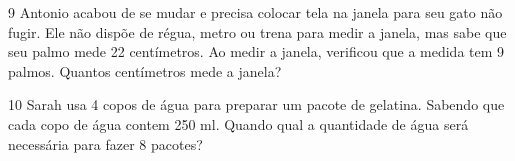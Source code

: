 \num{9} Antonio acabou de se mudar e precisa colocar tela na janela para seu gato não fugir.
Ele não dispõe de régua, metro ou trena para medir a janela, mas sabe que seu palmo mede 22 centímetros. Ao medir a janela, verificou que a medida tem 9 palmos. Quantos centímetros mede a janela?


\num{10} Sarah usa 4 copos de água para preparar um pacote de gelatina. Sabendo que cada copo de água contem 250 ml. Quando qual a quantidade de água será necessária para fazer 8 pacotes?  


